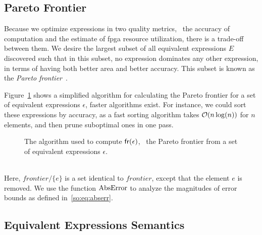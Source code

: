 \subsection{Pareto Frontier}
\label{so:sub:pareto}

Because we optimize expressions in two quality metrics, \ie~the accuracy of
computation and the estimate of \gls{fpga} resource utilization, there is
a trade-off between them. We desire the largest subset of all equivalent
expressions $E$ discovered such that in this subset, no expression dominates
any other expression, in terms of having both better area and better
accuracy. This subset is known as the \emph{Pareto frontier}~\cite{legriel10}.

Figure~\ref{so:alg:pareto} shows a simplified algorithm for calculating
the Pareto frontier for a set of equivalent expressions $\epsilon$, faster
algorithms exist.  For instance, we could sort these expressions by accuracy,
as a fast sorting algorithm takes $\operatorname{\mathcal{O}}(n\log(n))$ for $n$ elements, and then
prune suboptimal ones in one pass.
\begin{figure}[ht]
    \centering
    \begin{algorithmic}
        \singlespacing%
                    \EndIf{}
                \EndFor{}
            \EndFor{}
        \EndFunction%
    \end{algorithmic}
    \caption{%
        The algorithm used to compute $\operatorname{\mathsf{fr}}(\epsilon)$, \ie~the Pareto
        frontier from a set of equivalent expressions $\epsilon$.
    }\label{so:alg:pareto}
\end{figure} \\
Here, $\mathit{frontier} / \{ e \}$ is a set identical to $\mathit{frontier}$,
except that the element $e$ is removed.  We use the function $\operatorname{\mathrm{AbsError}}$ to
analyze the magnitudes of error bounds as defined in~\eqref{so:eq:abserr}.


\subsection{Equivalent Expressions Semantics}
\label{so:sub:equivalent_semantics}

